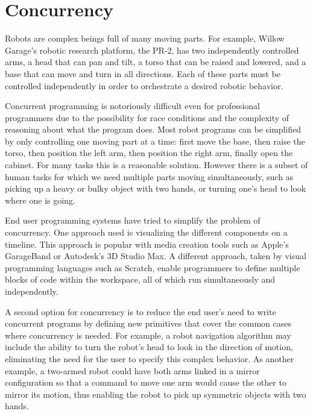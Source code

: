 \documentclass[11pt,twocolumn]{article}
\begin{document}
\section{Concurrency}


Robots are complex beings full of many moving parts. For example, Willow Garage's robotic research platform, the PR-2, has two independently controlled arms, a head that can pan and tilt, a torso that can be raised and lowered, and a base that can move and turn in all directions. Each of these parts must be controlled independently in order to orchestrate a desired robotic behavior.

Concurrent programming is notoriously difficult even for professional programmers due to the possibility for race conditions and the complexity of reasoning about what the program does. Most robot programs can be simplified by only controlling one moving part at a time: first move the base, then raise the torso, then position the left arm, then position the right arm, finally open the cabinet. For many tasks this is a reasonable solution. However there is a subset of human tasks for which we need multiple parts moving simultaneously, such as picking up a heavy or bulky object with two hands, or turning one's head to look where one is going.

End user programming systems have tried to simplify the problem of concurrency. One approach used is visualizing the different components on a timeline. This approach is popular with media creation tools such as Apple's GarageBand or Autodesk's 3D Studio Max. A different approach, taken by visual programming languages such as Scratch, enable programmers to define multiple blocks of code within the workspace, all of which run simultaneously and independently.

A second option for concurrency is to reduce the end user's need to write concurrent programs by defining new primitives that cover the common cases where concurrency is needed.  For example, a robot navigation algorithm may include the ability to turn the robot's head to look in the direction of motion, eliminating the need for the user to specify this complex behavior.  As another example, a two-armed robot could have both arms linked in a mirror configuration so that a command to move one arm would cause the other to mirror its motion, thus enabling the robot to pick up symmetric objects with two hands.
\end{document}
